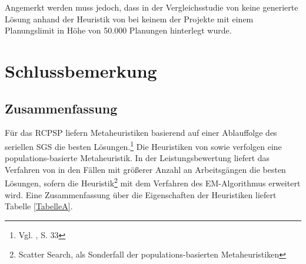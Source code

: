\documentclass[a4paper,12pt,normalheadings,footexclude,headinclude,liststotoc,nochapterprefix,onecolumn,oneside,parskip,pointlessnumbers]{scrreprt}
\begin{document}
Angemerkt werden muss jedoch, dass in der Vergleichsstudie von \cite{kolisch2006experimental} keine generierte Lösung anhand der Heuristik von \cite{bouleimen2003new} bei keinem der Projekte mit einem Planungslimit in Höhe von 50.000 Planungen hinterlegt wurde.








\chapter{Schlussbemerkung}
\section{Zusammenfassung}
Für das RCPSP liefern Metaheuristiken basierend auf einer Ablauffolge des seriellen SGS die besten Lösungen.\footnote{Vgl. \cite{kolisch2006experimental}, S. 33\label{Ergebnisse}} Die Heuristiken von \cite{debels2006hybrid} sowie \cite{kochetov2003evolutionary} verfolgen eine populations-basierte Metaheuristik. In der Leistungsbewertung liefert das Verfahren von \cite{debels2006hybrid} in den Fällen mit größerer Anzahl an Arbeitsgängen die besten Lösungen, sofern die Heuristik\footnote{Scatter Search, als Sonderfall der populations-basierten Metaheuristiken} mit dem Verfahren des EM-Algorithmus erweitert wird. Eine Zusammenfassung über die Eigenschaften der Heuristiken liefert Tabelle \ref{TabelleA}.
\end{document}
